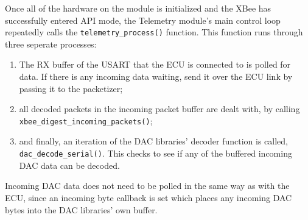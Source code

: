 Once all of the hardware on the module is initialized and the XBee has successfully entered API mode, the Telemetry module's main control loop repeatedly calls the \verb|telemetry_process()| function. This function runs through three seperate processes:
\begin{enumerate}
  \item The RX buffer of the USART that the ECU is connected to is polled for data. If there is any incoming data waiting, send it over the ECU link by passing it to the packetizer;
  \item all decoded packets in the incoming packet buffer are dealt with, by calling\\ \verb|xbee_digest_incoming_packets()|;
  \item and finally, an iteration of the DAC libraries' decoder function is called,\\ \verb|dac_decode_serial()|. This checks to see if any of the buffered incoming DAC data can be decoded.
\end{enumerate}

Incoming DAC data does not need to be polled in the same way as with the ECU, since an incoming byte callback is set which places any incoming DAC bytes into the DAC libraries' own buffer.
